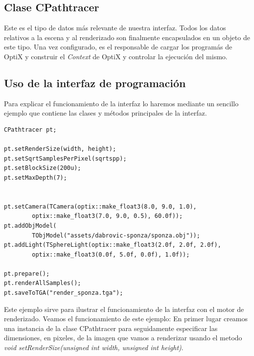 \subsection{Clase CPathtracer}

Este es el tipo de datos más relevante de nuestra interfaz. Todos los datos relativos a la escena y al renderizado son finalmente encapsulados en un objeto de este tipo. Una vez configurado, es el responsable de cargar los programás de OptiX y construir el \emph{Context} de OptiX y controlar la ejecución del mismo.

\subsection{Uso de la interfaz de programación}

Para explicar el funcionamiento de la interfaz lo haremos mediante un sencillo ejemplo que contiene las clases y métodos principales de la interfaz.




\lstset{style=customc}

\begin{lstlisting}
CPathtracer pt;

pt.setRenderSize(width, height);
pt.setSqrtSamplesPerPixel(sqrtspp);
pt.setBlockSize(200u);
pt.setMaxDepth(7);


pt.setCamera(TCamera(optix::make_float3(8.0, 9.0, 1.0), 
		optix::make_float3(7.0, 9.0, 0.5), 60.0f));
pt.addObjModel(
		TObjModel("assets/dabrovic-sponza/sponza.obj"));
pt.addLight(TSphereLight(optix::make_float3(2.0f, 2.0f, 2.0f),
		optix::make_float3(0.0f, 5.0f, 0.0f), 1.0f));

pt.prepare();
pt.renderAllSamples();
pt.saveToTGA("render_sponza.tga");
\end{lstlisting}

Este ejemplo sirve para ilustrar el funcionamiento de la interfaz con el motor de renderizado.
Veamos el funcionamiento de este ejemplo:
En primer lugar creamos una instancia de la clase CPathtracer para seguidamente especificar las dimensiones, en pixeles, de la imagen que vamos a renderizar usando el metodo \emph{void setRenderSize(unsigned int width, unsigned int height)}. 

